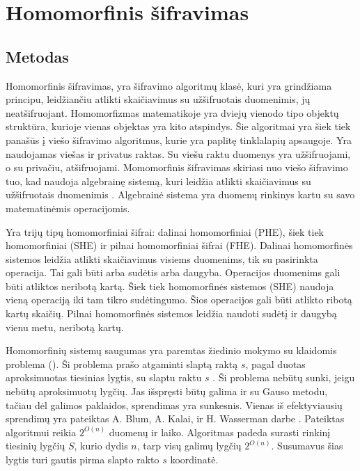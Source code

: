 \documentclass{VUMIFInfBakalaurinis}
\begin{document}
\section{Homomorfinis šifravimas}
\subsection{Metodas}
\par Homomorfinis šifravimas, yra šifravimo algoritmų klasė, kuri yra grindžiama principu, leidžiančiu atlikti skaičiavimus su užšifruotais duomenimis, jų neatšifruojant. Homomorfizmas matematikoje yra dviejų vienodo tipo objektų struktūra, kurioje vienas objektas yra kito atspindys.  Šie algoritmai yra šiek tiek panašūs į viešo šifravimo algoritmus, kurie yra paplitę tinklalapių apsaugoje. Yra naudojamas viešas ir privatus raktas. Su viešu raktu duomenys yra užšifruojami, o su privačiu, atšifruojami. Momomorfinis šifravimas skiriasi nuo viešo šifravimo tuo, kad naudoja algebrainę sistemą, kuri leidžia atlikti skaičiavimus su užšifruotais duomenimis \cite{14}. Algebrainė sistema yra duomenų rinkinys kartu su savo matematinėmis operacijomis.
\par Yra trijų tipų homomorfiniai šifrai: dalinai homomorfiniai (PHE), šiek tiek homomorfiniai (SHE) ir pilnai homomorfiniai šifrai (FHE). Dalinai homomorfinės sistemos leidžia atlikti skaičiavimus visiems duomenims, tik su pasirinkta operacija. Tai gali būti arba sudėtis arba daugyba.  Operacijos duomenims gali būti atliktos neribotą kartą.  Šiek tiek homomorfinės sistemos (SHE) naudoja vieną operaciją iki tam tikro sudėtingumo. Šios operacijos gali būti atlikto ribotą kartų skaičių. Pilnai homomorfinės sistemos leidžia naudoti sudėtį ir daugybą vienu metu, neribotą kartų. 
\par Homomorfinių sistemų saugumas yra paremtas žiedinio mokymo su klaidomis problema (). Ši problema prašo atgaminti slaptą raktą $s$, pagal duotas aproksimuotas tiesinias lygtis, su slaptu raktu $s$ \cite{16}. Ši problema nebūtų sunki, jeigu nebūtų aproksimuotų lygčių. Jas išspręsti būtų galima ir su Gauso metodu, tačiau dėl galimos paklaidos, sprendimas yra sunkesnis. Vienas iš efektyviausių sprendimų yra pateiktas A. Blum, A. Kalai, ir H. Wasserman darbe \cite{15}. Pateiktas algoritmui reikia $2^{O(n)}$ duomenų ir laiko. Algoritmas padeda surasti rinkinį tiesinių lygčių $S$, kurio dydis $n$, tarp visų galimų lygčių $2^{O(n)}$. Susumavus šias lygtis turi gautis pirma slapto rakto $s$ koordinatė.
\end{document}
